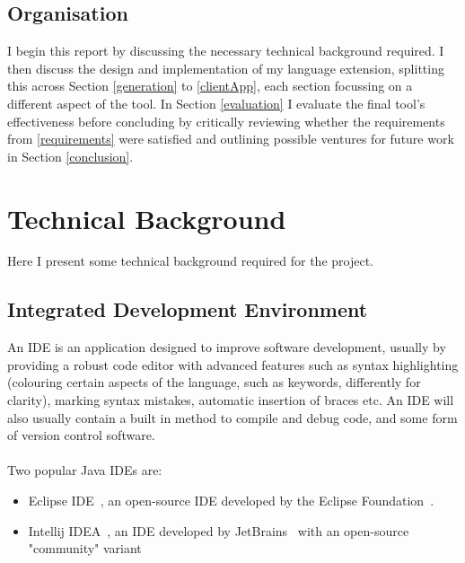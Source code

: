 \documentclass{article}
\begin{document}
\subsection{Organisation} 
I begin this report by discussing the necessary technical background required. I then discuss the design and implementation of my language extension, splitting this across Section \ref{generation} to \ref{clientApp}, each section focussing on a different aspect of the tool. In Section \ref{evaluation} I evaluate the final tool's effectiveness before concluding by critically reviewing whether the requirements from \ref{requirements} were satisfied and outlining possible ventures for future work in Section \ref{conclusion}. 

\section{Technical Background}
Here I present some technical background required for the project.
\subsection{Integrated Development Environment}
An IDE is an application designed to improve software development, usually by providing a robust code editor with advanced features such as syntax highlighting (colouring certain aspects of the language, such as keywords, differently for clarity), marking syntax mistakes, automatic insertion of braces etc. An IDE will also usually contain a built in method to compile and debug code, and some form of version control software. 
\\
\\
Two popular Java IDEs are:
\begin{itemize}
\item Eclipse IDE~\cite{eclipse}, an open-source IDE developed by the Eclipse Foundation~\cite{eclipseFoundation}.
\item Intellij IDEA~\cite{intellij}, an IDE developed by JetBrains~\cite{jetbrains} with an open-source "community" variant
\end{itemize}
%
\end{document}
